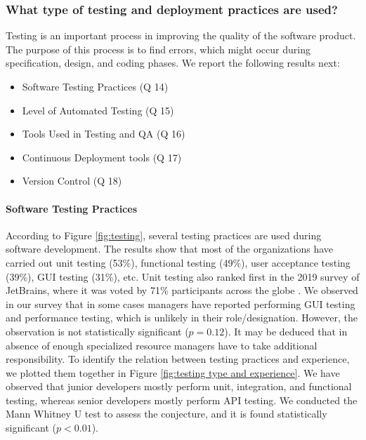 \subsubsection{What type of testing and deployment practices are used?}
\label{testing_practices}

Testing is an important process in improving the quality of the software product. The purpose of this process is to find errors, which might occur during specification, design, and coding phases. We report the following results next:

\begin{itemize}
\item Software Testing Practices (Q 14)
\item Level of Automated Testing (Q 15)
\item Tools Used in Testing and QA (Q 16)
\item Continuous Deployment tools (Q 17)
\item Version Control (Q 18)
\end{itemize}


\paragraph{Software Testing Practices}
According to Figure \ref{fig:testing}, several testing practices are used during software development. The results show that most of the organizations have carried out unit testing (53\%), functional testing (49\%), user acceptance testing (39\%), GUI testing (31\%), etc. Unit testing also ranked first in the 2019 survey of JetBrains, where it was voted by 71\% participants across the globe \cite{JetBrains2019}. We observed in our survey that in some cases managers have reported performing GUI testing and performance testing, which is unlikely in their role/designation. However, the observation is not statistically significant ($p=0.12$). It may be deduced that in absence of enough specialized resource managers have to take additional responsibility. To identify the relation between testing practices and experience, we plotted them together in Figure \ref{fig:testing type and experience}. We have observed that junior developers mostly perform unit, integration, and functional testing, whereas senior developers mostly perform API testing. We conducted the Mann Whitney U test to assess the conjecture, and it is found statistically significant ($p<0.01$).

